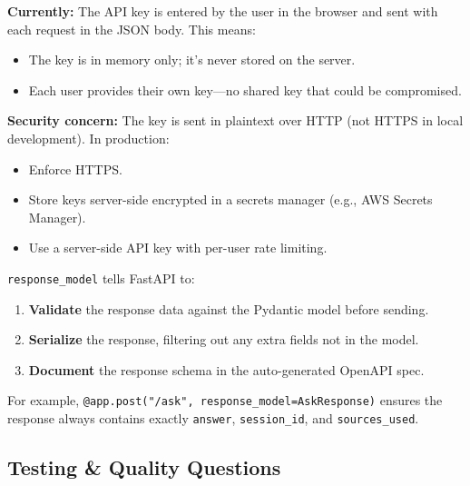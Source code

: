 \documentclass[12pt,a4paper]{article}
\begin{document}
\begin{interviewbox}
\end{interviewbox}
\begin{answerbox}
\textbf{Currently:} The API key is entered by the user in the browser and sent with each request in the JSON body. This means:
\begin{itemize}
  \item The key is in memory only; it's never stored on the server.
  \item Each user provides their own key—no shared key that could be compromised.
\end{itemize}
\textbf{Security concern:} The key is sent in plaintext over HTTP (not HTTPS in local development). In production:
\begin{itemize}
  \item Enforce HTTPS.
  \item Store keys server-side encrypted in a secrets manager (e.g., AWS Secrets Manager).
  \item Use a server-side API key with per-user rate limiting.
\end{itemize}
\end{answerbox}

\begin{interviewbox}
\end{interviewbox}
\begin{answerbox}
\texttt{response\_model} tells FastAPI to:
\begin{enumerate}
  \item \textbf{Validate} the response data against the Pydantic model before sending.
  \item \textbf{Serialize} the response, filtering out any extra fields not in the model.
  \item \textbf{Document} the response schema in the auto-generated OpenAPI spec.
\end{enumerate}
For example, \texttt{@app.post("/ask", response\_model=AskResponse)} ensures the response always contains exactly \texttt{answer}, \texttt{session\_id}, and \texttt{sources\_used}.
\end{answerbox}

\subsection{Testing \& Quality Questions}
\end{document}
